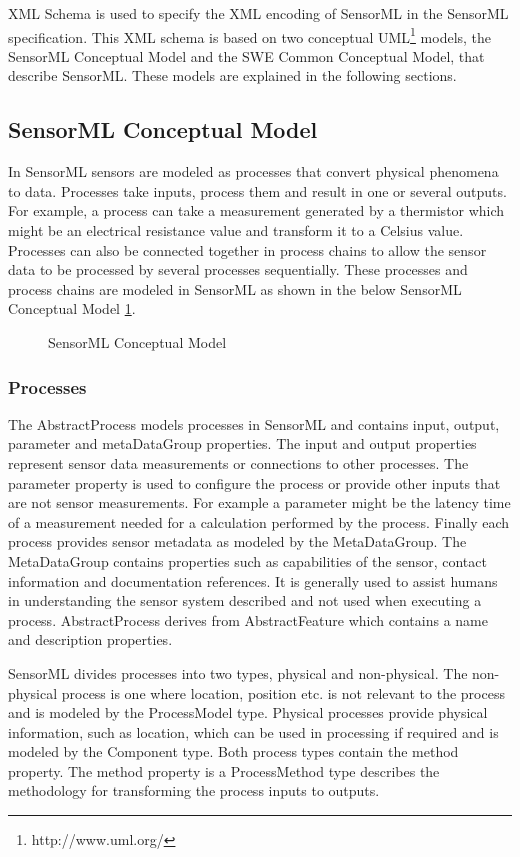 \documentclass[]{final_report}
\begin{document}
XML Schema is used to specify the XML encoding of SensorML in the SensorML specification. This XML schema is based on two conceptual UML\footnote{http://www.uml.org/} models, the SensorML Conceptual Model and the SWE Common Conceptual Model, that describe SensorML. These models are explained in the following sections.

\subsection{SensorML Conceptual Model}
In SensorML sensors are modeled as processes that convert physical phenomena to data. Processes take inputs, process them and result in one or several outputs. For example, a process can take a measurement generated by a thermistor which might be an electrical resistance value and transform it to a Celsius value. Processes can also be connected together in process chains to allow the sensor data to be processed by several processes sequentially. These processes and process chains are modeled in SensorML as shown in the  below SensorML Conceptual Model \ref{fig:SMLConceptualModel}.

\begin{figure}[h]
\centering
{}
\caption{SensorML Conceptual Model}\label{fig:SMLConceptualModel}
\end{figure}
\newpage

\subsubsection{Processes}
The AbstractProcess models processes in SensorML and contains input, output, parameter and metaDataGroup properties. The input and output properties represent sensor data measurements or connections to other processes. The parameter property is used to configure the process or provide other inputs that are not sensor measurements. For example a parameter might be the latency time of a measurement needed for a calculation performed by the process. Finally each process provides sensor metadata as modeled by the MetaDataGroup. The MetaDataGroup contains properties such as capabilities of the sensor, contact information and documentation references. It is generally used to assist humans in understanding the sensor system described and not used when executing a process. AbstractProcess derives from AbstractFeature which contains a name and description properties.

SensorML divides processes into two types, physical and non-physical. The non-physical process is one where  location, position etc. is not relevant to the process and is modeled by the ProcessModel type. Physical processes provide physical information, such as location, which can be used in processing if required and is modeled by the Component type. Both process types contain the method property. The method property is a ProcessMethod type describes the methodology for transforming the process inputs to outputs.
\end{document}
